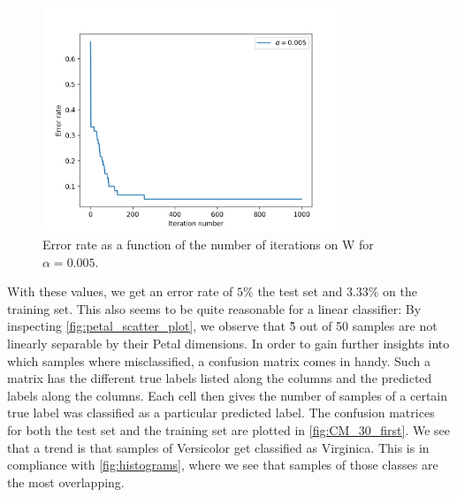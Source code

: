 \documentclass{article}
\begin{document}
\begin{figure}
    \centering
    \includegraphics[width=0.8\textwidth]{../images/error_rate_by_iteration_number.png}
    \caption{Error rate as a function of the number of iterations on W for $\alpha = 0.005$.}
    \label{fig:error_rate}
\end{figure}

With these values, we get an error rate of $5\%$ the test set and $3.33\%$ on the training set. This
also seems to be quite reasonable for a linear classifier: By inspecting \autoref{fig:petal_scatter_plot},
we observe that \~5 out of 50 samples are not linearly separable by their Petal dimensions.
In order to gain further insights into which samples where misclassified, a confusion matrix comes in
handy. Such a matrix has the different true labels listed along the columns and the predicted labels
along the columns. Each cell then gives the number of samples of a certain true label was classified
as a particular predicted label. The confusion matrices for both the test set and the training set are
plotted in \autoref{fig:CM_30_first}. We see that a trend is that samples of Versicolor get classified
as Virginica. This is in compliance with \autoref{fig:histograms}, where we see that samples of
those classes are the most overlapping.
\end{document}
